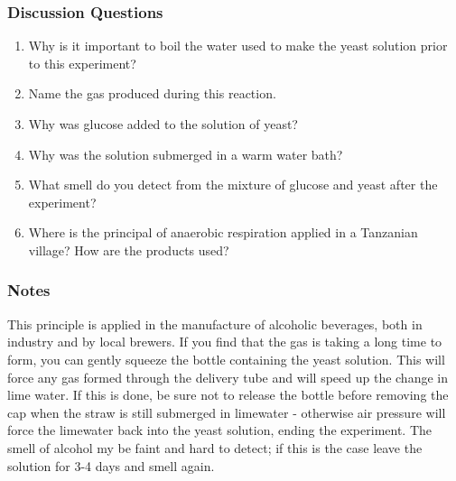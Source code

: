 \subsubsection*{Discussion Questions}
\begin{enumerate}
\item{Why is it important to boil the water used to make the yeast solution prior to this experiment?}
\item{Name the gas produced during this reaction.}
\item{Why was glucose added to the solution of yeast?}
\item{Why was the solution submerged in a warm water bath?}
\item{What smell do you detect from the mixture of glucose and yeast after the experiment?}
\item{Where is the principal of anaerobic respiration applied in a Tanzanian village? How are the products used?}
\end{enumerate}

\subsubsection*{Notes}
This principle is applied in the manufacture of alcoholic beverages, both in industry and by local brewers.
If you find that the gas is taking a long time to form, you can gently squeeze the bottle containing the yeast solution. This will force any gas formed through the delivery tube and will speed up the change in lime water. If this is done, be sure not to release the bottle before removing the cap when the straw is still submerged in limewater - otherwise air pressure will force the limewater back into the yeast solution, ending the experiment.
The smell of alcohol my be faint and hard to detect; if this is the case leave the solution for 3-4 days and smell again.